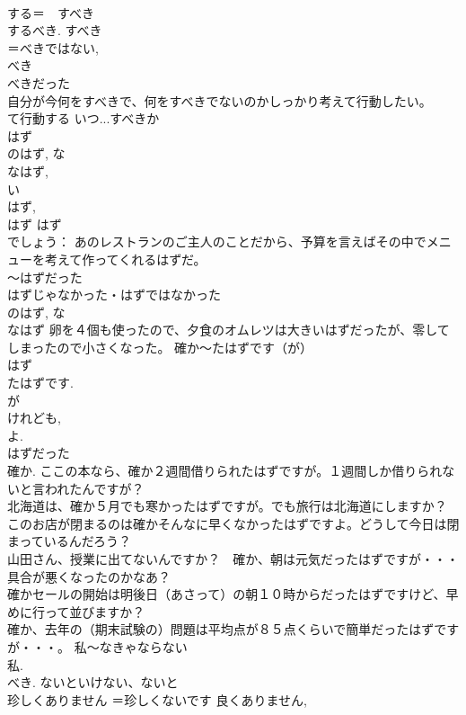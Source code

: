 \documentclass[8pt]{extreport}
\begin{document}
\begin{CJK}{UTF8}{min}
\\	する＝　すべき 
\\	するべき. すべき 
\\	＝べきではない, 
\\	べき 
\\	べきだった 
\\	自分が今何をすべきで、何をすべきでないのかしっかり考えて行動したい。 
\\	て行動する いつ...すべきか 
\\	はず 
\\	のはず, な
\\	なはず, 
\\	い
\\	はず, 
\\	はず はず 
\\	でしょう： あのレストランのご主人のことだから、予算を言えばその中でメニューを考えて作ってくれるはずだ。 
\\	～はずだった 
\\	はずじゃなかった・はずではなかった 
\\	のはず, な
\\	なはず 卵を４個も使ったので、夕食のオムレツは大きいはずだったが、零してしまったので小さくなった。 確か～たはずです（が） 
\\	はず 
\\	たはずです. 
\\	が 
\\	けれども, 
\\	よ. 
\\	はずだった 
\\	確か. ここの本なら、確か２週間借りられたはずですが。１週間しか借りられないと言われたんですが？ 
\\	北海道は、確か５月でも寒かったはずですが。でも旅行は北海道にしますか？ 
\\	このお店が閉まるのは確かそんなに早くなかったはずですよ。どうして今日は閉まっているんだろう？　
\\	山田さん、授業に出てないんですか？　確か、朝は元気だったはずですが・・・　具合が悪くなったのかなあ？ 
\\	確かセールの開始は明後日（あさって）の朝１０時からだったはずですけど、早めに行って並びますか？ 
\\	確か、去年の（期末試験の）問題は平均点が８５点くらいで簡単だったはずですが・・・。 私～なきゃならない 
\\	私. 
\\	べき. ないといけない、ないと 
\\	珍しくありません	＝珍しくないです 良くありません, 

\end{CJK}
\end{document}
